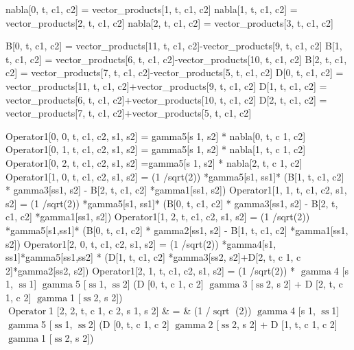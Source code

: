   nabla[0, t, c1, c2] = vector_products[1, t, c1, c2]
  nabla[1, t, c1, c2] = vector_products[2, t, c1, c2]
  nabla[2, t, c1, c2] = vector_products[3, t, c1, c2]
  
    B[0, t, c1, c2] = vector_products[11, t, c1, c2]-vector_products[9, t, c1, c2]
    B[1, t, c1, c2] = vector_products[6, t, c1, c2]-vector_products[10, t, c1, c2]
    B[2, t, c1, c2] = vector_products[7, t, c1, c2]-vector_products[5, t, c1, c2]
    D[0, t, c1, c2] = vector_products[11, t, c1, c2]+vector_products[9, t, c1, c2]
    D[1, t, c1, c2] = vector_products[6, t, c1, c2]+vector_products[10, t, c1, c2]
    D[2, t, c1, c2] = vector_products[7, t, c1, c2]+vector_products[5, t, c1, c2]

    Operator1[0, 0, t, c1, c2, s1, s2] = gamma5[s 1, s2] * nabla[0, t, c 1, c2]
    Operator1[0, 1, t, c1, c2, s1, s2]  = gamma5[s 1, s2] * nabla[1, t, c 1, c2]
    Operator1[0, 2, t, c1, c2, s1, s2]  =gamma5[s 1, s2] * nabla[2, t, c 1, c2]
    Operator1[1, 0, t, c1, c2, s1, s2]  = (1 /sqrt(2)) *gamma5[s1, ss1]* (B[1, t, c1, c2] * gamma3[ss1, s2] - B[2, t, c1, c2] *gamma1[ss1, s2])
    Operator1[1, 1, t, c1, c2, s1, s2]  = (1 /sqrt(2)) *gamma5[s1, ss1]* (B[0, t, c1, c2] * gamma3[ss1, s2] - B[2, t, c1, c2] *gamma1[ss1, s2])
    Operator1[1, 2, t, c1, c2, s1, s2]  = (1 /sqrt(2)) *gamma5[s1,ss1]* (B[0, t, c1, c2] * gamma2[ss1, s2] - B[1, t, c1, c2] *gamma1[ss1, s2])
    Operator1[2, 0, t, c1, c2, s1, s2]  = (1 /sqrt(2)) *gamma4[s1, ss1]*gamma5[ss1,ss2] * (D[1, t, c1, c2] *gamma3[ss2, s2]+D[2, t, c 1, c 2]*gamma2[ss2, s2])
    Operator1[2, 1, t, c1, c2, s1, s2]  = (1 /sqrt(2)) *
    \ensuremath{\operatorname{gamma}}4 [s 1, \ensuremath{\operatorname{ss}}1]
    \ast \ensuremath{\operatorname{gamma}}5 [\ensuremath{\operatorname{ss}}1,
    \ensuremath{\operatorname{ss}}2] \ast (D [0, t, c 1, c 2] \ast
    \ensuremath{\operatorname{gamma}}3 [\ensuremath{\operatorname{ss}}2, s 2]
    + D [2, t, c 1, c 2] \ast \ensuremath{\operatorname{gamma}}1
    [\ensuremath{\operatorname{ss}}2, s 2])\\
    \ensuremath{\operatorname{Operator}}1 [2, 2, t, c 1, c 2, s 1, s 2] & = &
    (1 /\ensuremath{\operatorname{sqrt}} (2)) \ast
    \ensuremath{\operatorname{gamma}}4 [s 1, \ensuremath{\operatorname{ss}}1]
    \ast \ensuremath{\operatorname{gamma}}5 [\ensuremath{\operatorname{ss}}1,
    \ensuremath{\operatorname{ss}}2] \ast (D [0, t, c 1, c 2] \ast
    \ensuremath{\operatorname{gamma}}2 [\ensuremath{\operatorname{ss}}2, s 2]
    + D [1, t, c 1, c 2] \ast \ensuremath{\operatorname{gamma}}1
    [\ensuremath{\operatorname{ss}}2, s 2])\\
